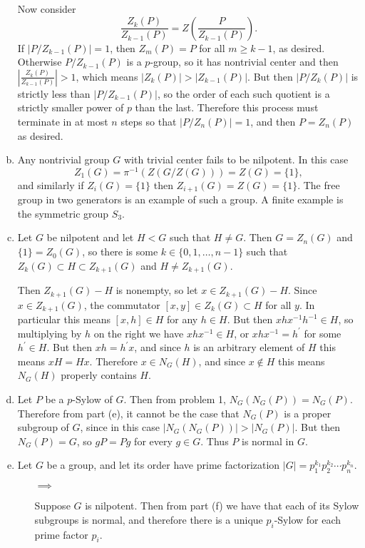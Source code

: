 \documentclass{article}
\begin{document}
\begin{Answer}
\begin{enumerate}[(a)]
{    Now consider
    $$
    \frac{Z_k(P)}{Z_{k-1}(P)} = Z\left(\frac{P}{Z_{k-1}(P)}\right).
    $$
    If $|P / Z_{k-1}(P)| = 1$, then $Z_{m}(P) = P$ for all $m \geq
    k-1$, as desired. Otherwise $P / Z_{k-1}(P)$ is a $p$-group,
    so it has nontrivial center and then
    $\left|\frac{Z_k(P)}{Z_{k-1}(P)}\right| > 1$, which means
    $|Z_k(P)| > |Z_{k-1}(P)|$. But then
    $|P / Z_k(P)|$ is strictly less than $|P / Z_{k-1}(P)|$, so the
    order of each such quotient is a strictly smaller power of
    $p$ than the last. Therefore this process must terminate in at
    most $n$ steps so that $|P / Z_n(P)| = 1$,
    and then $P = Z_n(P)$ as desired.
  }
  \item{
    Any nontrivial group $G$ with trivial center fails to be nilpotent.
    In this case
    $$
    Z_1(G) = \pi^{-1}(Z(G / Z(G))) = Z(G) = \{ 1 \},
    $$
    and similarly if
    $Z_i(G) = \{ 1 \}$ then $Z_{i+1}(G) = Z(G) = \{ 1 \}$. The free group in
    two generators is an example of such a group. A finite example is
    the symmetric group $S_3$.
  }
  \item{
    Let $G$ be nilpotent and let $H < G$ such that $H \neq G$.
    Then $G = Z_n(G)$ and $\{ 1 \} = Z_0(G)$, so there is some
    $k \in \{0, 1, \dots, n-1\}$ such that
    $Z_k(G) \subset H \subset Z_{k+1}(G)$ and $H \neq Z_{k+1}(G)$.

    Then $Z_{k+1}(G) - H$ is nonempty, so let $x \in Z_{k+1}(G) - H$.
    Since $x \in Z_{k+1}(G)$, the commutator
    $[x, y] \in Z_{k}(G) \subset H$ for all $y$. In particular this means
    $[x, h] \in H$ for any $h \in H$. But then
    $x h x^{-1} h^{-1} \in H$, so multiplying by $h$ on the right we
    have $x h x^{-1} \in H$, or $x h x^{-1} = h^\prime$ for some
    $h^\prime \in H$. But then $x h = h^\prime x$, and since $h$ is an
    arbitrary element of $H$ this means $x H = H x$. Therefore
    $x \in N_G(H)$, and since $x \notin H$ this means
    $N_G(H)$ properly contains $H$.
  }
  \item{
    Let $P$ be a $p$-Sylow of $G$. Then from problem 1, $N_G(N_G(P)) =
    N_G(P)$. Therefore from part (e), it cannot be the case that
    $N_G(P)$ is a proper subgroup of $G$, since in this case
    $|N_G(N_G(P))| > |N_G(P)|$. But then $N_G(P) = G$, so $gP = Pg$
    for every $g \in G$. Thus $P$ is normal in $G$.
  }
  \item{
    Let $G$ be a group, and let its order have prime factorization
    $|G| = p_1^{k_1} p_2^{k_2} \cdots p_n^{k_n}$.
    \begin{itemize}
      \item[$\implies$]{
        Suppose $G$ is nilpotent. Then from part (f) we have that each
        of its Sylow subgroups is normal, and therefore there is a
        unique $p_i$-Sylow for each prime factor $p_i$.

}
\end{itemize}}
\end{enumerate}
\end{Answer}
\end{document}
